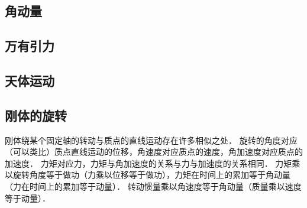 
\subsection{角动量}

\subsection{万有引力}

\subsection{天体运动}

\subsection{刚体的旋转}
刚体绕某个固定轴的转动与质点的直线运动存在许多相似之处． 旋转的角度对应（可以类比）质点直线运动的位移，角速度对应质点的速度，角加速度对应质点的加速度． 力矩对应力，力矩与角加速度的关系与力与加速度的关系相同． 力矩乘以旋转角度等于做功（力乘以位移等于做功），力矩在时间上的累加等于角动量（力在时间上的累加等于动量）． 转动惯量乘以角速度等于角动量（质量乘以速度等于动量）．
